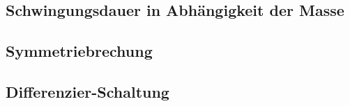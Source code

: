 \subsection{Schwingungsdauer in Abhängigkeit der Masse}
\label{sub:schwingungsdauer}

\subsection{Symmetriebrechung}
\label{sub:symbrechung}

\subsection{Differenzier-Schaltung}
\label{sub:diffSchaltung}
